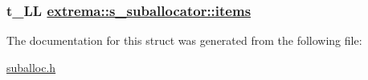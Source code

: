 \hypertarget{structextrema_1_1s__suballocator_70ebd18b96ccee641329c9276a91072d}{
\subsubsection[items]{\setlength{\rightskip}{0pt plus 5cm}t\_\-LL \hyperlink{structextrema_1_1s__suballocator_70ebd18b96ccee641329c9276a91072d}{extrema::s\_\-suballocator::items}}}
\label{structextrema_1_1s__suballocator_70ebd18b96ccee641329c9276a91072d}




The documentation for this struct was generated from the following file:\begin{CompactItemize}
\item 
\hyperlink{suballoc_8h}{suballoc.h}\end{CompactItemize}
